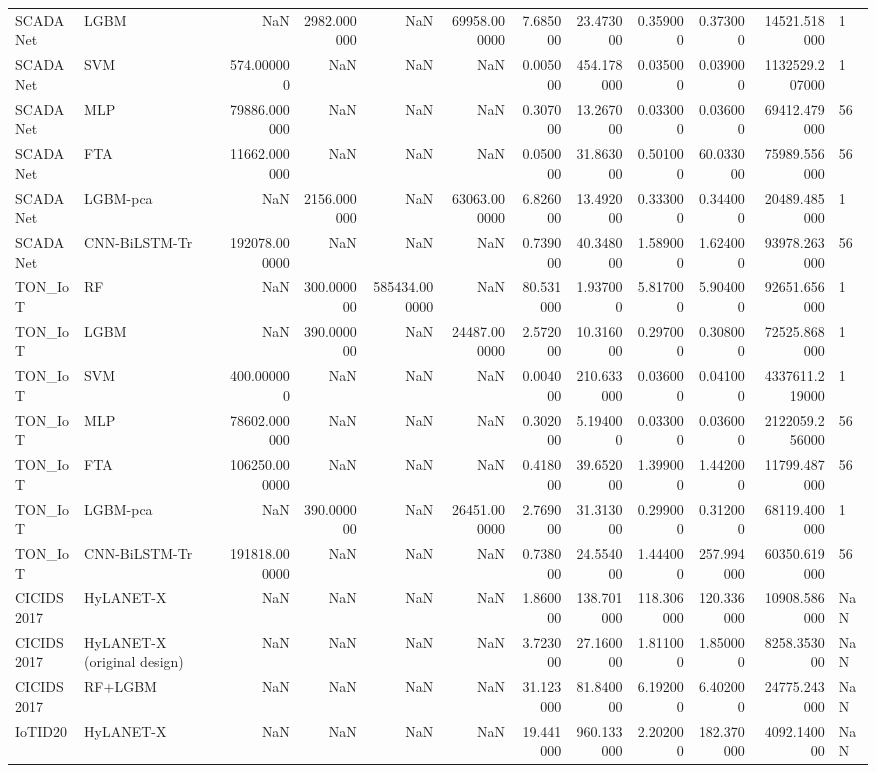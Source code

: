 \begin{tabular}{llrrrrrrrrrl}
SCADANet & LGBM & NaN & 2982.000000 & NaN & 69958.000000 & 7.685000 & 23.473000 & 0.359000 & 0.373000 & 14521.518000 & 1 \\
SCADANet & SVM & 574.000000 & NaN & NaN & NaN & 0.005000 & 454.178000 & 0.035000 & 0.039000 & 1132529.207000 & 1 \\
SCADANet & MLP & 79886.000000 & NaN & NaN & NaN & 0.307000 & 13.267000 & 0.033000 & 0.036000 & 69412.479000 & 56 \\
SCADANet & FTA & 11662.000000 & NaN & NaN & NaN & 0.050000 & 31.863000 & 0.501000 & 60.033000 & 75989.556000 & 56 \\
SCADANet & LGBM-pca & NaN & 2156.000000 & NaN & 63063.000000 & 6.826000 & 13.492000 & 0.333000 & 0.344000 & 20489.485000 & 1 \\
SCADANet & CNN-BiLSTM-Tr & 192078.000000 & NaN & NaN & NaN & 0.739000 & 40.348000 & 1.589000 & 1.624000 & 93978.263000 & 56 \\
TON\_IoT & RF & NaN & 300.000000 & 585434.000000 & NaN & 80.531000 & 1.937000 & 5.817000 & 5.904000 & 92651.656000 & 1 \\
TON\_IoT & LGBM & NaN & 390.000000 & NaN & 24487.000000 & 2.572000 & 10.316000 & 0.297000 & 0.308000 & 72525.868000 & 1 \\
TON\_IoT & SVM & 400.000000 & NaN & NaN & NaN & 0.004000 & 210.633000 & 0.036000 & 0.041000 & 4337611.219000 & 1 \\
TON\_IoT & MLP & 78602.000000 & NaN & NaN & NaN & 0.302000 & 5.194000 & 0.033000 & 0.036000 & 2122059.256000 & 56 \\
TON\_IoT & FTA & 106250.000000 & NaN & NaN & NaN & 0.418000 & 39.652000 & 1.399000 & 1.442000 & 11799.487000 & 56 \\
TON\_IoT & LGBM-pca & NaN & 390.000000 & NaN & 26451.000000 & 2.769000 & 31.313000 & 0.299000 & 0.312000 & 68119.400000 & 1 \\
TON\_IoT & CNN-BiLSTM-Tr & 191818.000000 & NaN & NaN & NaN & 0.738000 & 24.554000 & 1.444000 & 257.994000 & 60350.619000 & 56 \\
CICIDS2017 & HyLANET-X & NaN & NaN & NaN & NaN & 1.860000 & 138.701000 & 118.306000 & 120.336000 & 10908.586000 & NaN \\
CICIDS2017 & HyLANET-X (original design) & NaN & NaN & NaN & NaN & 3.723000 & 27.160000 & 1.811000 & 1.850000 & 8258.353000 & NaN \\
CICIDS2017 & RF+LGBM & NaN & NaN & NaN & NaN & 31.123000 & 81.840000 & 6.192000 & 6.402000 & 24775.243000 & NaN \\
IoTID20 & HyLANET-X & NaN & NaN & NaN & NaN & 19.441000 & 960.133000 & 2.202000 & 182.370000 & 4092.140000 & NaN \\

\end{tabular}
